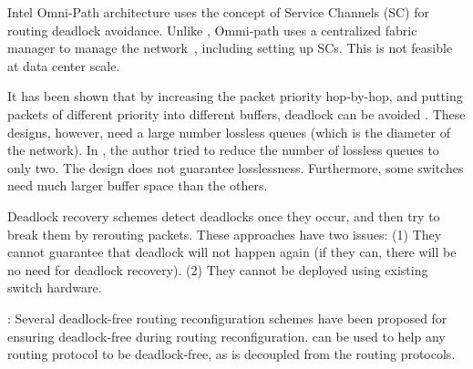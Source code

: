  Intel Omni-Path architecture \cite{omnipath} uses the
concept of Service Channels (SC) for routing deadlock avoidance.  Unlike
\sysname{}, Ommi-path uses a centralized fabric manager to manage the
network~\cite{omnipath}, including setting up SCs. This is not feasible at
data center scale.


 It has been shown that by
increasing the packet priority hop-by-hop, and putting packets of different
priority into different buffers, deadlock can be avoided
\cite{firstpaper,survey,datanetworks,karol2003prevention}. These designs,
however, need a large number lossless queues (which is the diameter of the
network). In \cite{dag}, the author tried to reduce the number of lossless
queues to only two. The design does not guarantee losslessness. Furthermore,
some switches need much larger buffer space than the others. 

 Deadlock recovery schemes
\cite{isca95,shpiner2016unlocking,venkatramani1996,martinez1997,Lopez1998}
detect deadlocks once they occur, and then try to break them by rerouting
packets.  These approaches have two issues: (1) They cannot guarantee that
deadlock will not happen again (if they can, there will be no need for deadlock
recovery). (2) They cannot be deployed using existing switch hardware.



:
Several deadlock-free routing reconfiguration schemes
\cite{automatic,lysne2005,doublescheme,gara2005} have been proposed for
ensuring deadlock-free during routing reconfiguration. \sysname{} can
be used to help any routing protocol to be deadlock-free, as
\sysname{} is decoupled from the routing protocols.

